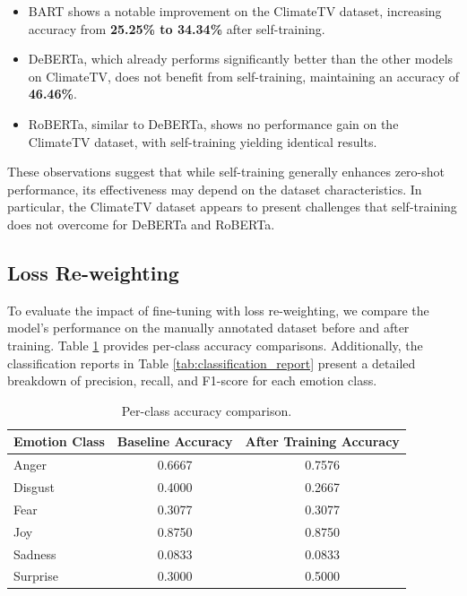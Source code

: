 \begin{itemize}
    \item BART shows a notable improvement on the ClimateTV dataset, increasing accuracy from \textbf{25.25\% to 34.34\%} after self-training.
    \item DeBERTa, which already performs significantly better than the other models on ClimateTV, does not benefit from self-training, maintaining an accuracy of \textbf{46.46\%}.
    \item RoBERTa, similar to DeBERTa, shows no performance gain on the ClimateTV dataset, with self-training yielding identical results.
\end{itemize}

These observations suggest that while self-training generally enhances zero-shot performance, its effectiveness may depend on the dataset characteristics. In particular, the ClimateTV dataset appears to present challenges that self-training does not overcome for DeBERTa and RoBERTa.


\subsection{Loss Re-weighting}

To evaluate the impact of fine-tuning with loss re-weighting, we compare the model's performance on the manually annotated dataset before and after training. Table \ref{tab:per_class} provides per-class accuracy comparisons. Additionally, the classification reports in Table \ref{tab:classification_report} present a detailed breakdown of precision, recall, and F1-score for each emotion class.
\newline

\begin{table}[ht]
    \centering
    \begin{tabular}{lcc}
        \hline
        \textbf{Emotion Class} & \textbf{Baseline Accuracy} & \textbf{After Training Accuracy} \\
        \hline
        Anger & 0.6667 & 0.7576 \\
        Disgust & 0.4000 & 0.2667 \\
        Fear & 0.3077 & 0.3077 \\
        Joy & 0.8750 & 0.8750 \\
        Sadness & 0.0833 & 0.0833 \\
        Surprise & 0.3000 & 0.5000 \\
        \hline
    \end{tabular}
    \caption{Per-class accuracy comparison.}
    \label{tab:per_class}
\end{table}

